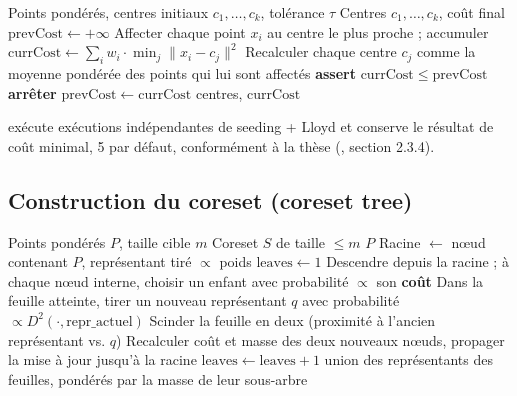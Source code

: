 \begin{algorithm}[h]
\caption{ : algorithme de Lloyd pondéré}
\label{alg:lloyd}
\begin{algorithmic}[1]
\REQUIRE Points pondérés, centres initiaux $c_1,\dots,c_k$, tolérance $\tau$
\ENSURE Centres $c_1,\dots,c_k$, coût final
\STATE $\mathrm{prevCost} \leftarrow +\infty$
\REPEAT
  \STATE Affecter chaque point $x_i$ au centre le plus proche ; accumuler $\mathrm{currCost} \leftarrow \sum_i w_i \cdot \min_j \lVert x_i - c_j \rVert^2$
  \STATE Recalculer chaque centre $c_j$ comme la moyenne pondérée des points qui lui sont affectés
  \STATE \textbf{assert} $\mathrm{currCost} \le \mathrm{prevCost}$ 
    \STATE \textbf{arrêter}
  \ENDIF
  \STATE $\mathrm{prevCost} \leftarrow \mathrm{currCost}$
\RETURN centres, $\mathrm{currCost}$
\end{algorithmic}
\end{algorithm}

 exécute  exécutions indépendantes de
seeding + Lloyd et conserve le résultat de coût minimal, 5 par défaut,
conformément à la thèse (\cite{bitsakis2018}, section 2.3.4).

\subsection{Construction du coreset (coreset tree)}

\begin{algorithm}[h]
\caption{ : construction du coreset par arbre binaire divisif}
\label{alg:coresettree}
\begin{algorithmic}[1]
\REQUIRE Points pondérés $P$, taille cible $m$
\ENSURE Coreset $S$ de taille $\le m$
  \RETURN $P$ 
\ENDIF
\STATE Racine $\leftarrow$ nœud contenant $P$, représentant tiré $\propto$ poids
\STATE $\mathrm{leaves} \leftarrow 1$
  \STATE Descendre depuis la racine ; à chaque nœud interne, choisir un enfant avec probabilité $\propto$ son \textbf{coût}
  \STATE Dans la feuille atteinte, tirer un nouveau représentant $q$ avec probabilité $\propto D^2(\cdot, \mathrm{repr\_actuel})$
  \STATE Scinder la feuille en deux (proximité à l'ancien représentant vs. $q$)
  \STATE Recalculer coût et masse des deux nouveaux nœuds, propager la mise à jour jusqu'à la racine
  \STATE $\mathrm{leaves} \leftarrow \mathrm{leaves} + 1$
\ENDWHILE
\RETURN union des représentants des feuilles, pondérés par la masse de leur sous-arbre
\end{algorithmic}
\end{algorithm}

